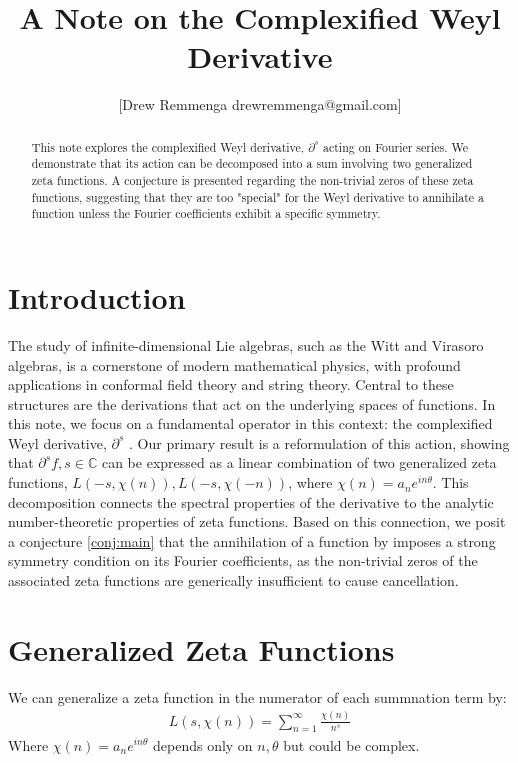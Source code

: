 \documentclass{artjlt}
\title{A Note on the Complexified Weyl Derivative}
\author{[Drew Remmenga drewremmenga@gmail.com]}
\newcommand{\?}{\textbackslash}
\newcommand{\C}{\mathbb{C}}
\begin{document}
\maketitle
\begin{abstract}
  This note explores the complexified Weyl derivative, $\partial^s$ acting on Fourier series. 
We demonstrate that its action can be decomposed into a sum involving two generalized zeta functions. 
A conjecture is presented regarding the non-trivial zeros of these zeta functions, suggesting that they are too "special" for the Weyl derivative to annihilate a function unless the Fourier coefficients exhibit a specific symmetry.
\end{abstract}
\section{Introduction}
The study of infinite-dimensional Lie algebras, such as the Witt and Virasoro algebras, is a cornerstone of modern mathematical physics, with profound applications in conformal field theory and string theory. Central to these structures are the derivations that act on the underlying spaces of functions. In this note, we focus on a fundamental operator in this context: the complexified Weyl derivative, $\partial^s$ \cite{article}.
Our primary result is a reformulation of this action, showing that $\partial^s f, s \in \C$ can be expressed as a linear combination of two generalized zeta functions, $L(-s,\chi(n)), L(-s,\chi(-n))$, where $\chi(n) =a_n e^{i n \theta}$. This decomposition connects the spectral properties of the derivative to the analytic number-theoretic properties of zeta functions. Based on this connection, we posit a conjecture \ref{conj:main} that the annihilation of a function by imposes a strong symmetry condition on its Fourier coefficients, as the non-trivial zeros of the associated zeta functions are generically insufficient to cause cancellation.
\section{Generalized Zeta Functions}
We can generalize a zeta function in the numerator of each summnation term by:
\begin{align*}
  L(s,\chi(n)) = \sum_{n=1}^{\infty}\frac{\chi(n)}{n^s}
\end{align*}
Where $\chi(n)= a_n e^{i n \theta}$ depends only on $n,\theta$ but could be complex. 
\end{document}
